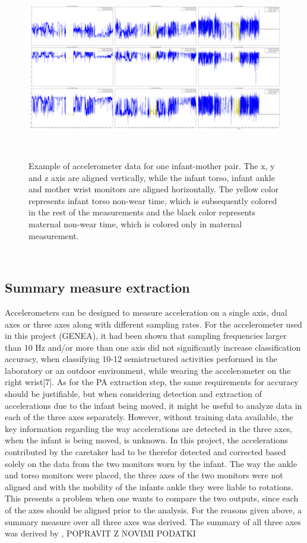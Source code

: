 \documentclass{article}
\begin{document}
{\begin{figure}[h]
\includegraphics[width=15cm, height=8cm]{21NoWearTimeLabeled.png}
\caption{Example of accelerometer data for one infant-mother pair. The x, y and z axis are aligned vertically, while the infant torso, infant ankle and mother wrist monitors are aligned horizontally. The yellow color represents infant torso non-wear time, which is subsequently colored in the rest of the measurements and the black color represents maternal non-wear time, which is colored only in maternal measurement.}
\end{figure}
\\
\subsection{Summary measure extraction}
Accelerometers can be designed to measure acceleration on a single axis, dual axes or three axes along with different sampling rates. For the accelerometer used in this project  (GENEA), it had been shown that sampling frequencies larger than 10 Hz and/or more than one axis did not significantly increase classification accuracy, when classifying 10-12 semistructured activities performed in the laboratory or an outdoor environment, while wearing the accelerometer on the right wrist[7]. As for the PA extraction step, the same requirements for accuracy should be justifiable, but when considering detection and extraction of accelerations due to the infant being moved, it might be useful to analyze data in each of the three axes separately. However, without training data available, the key information regarding the way accelerations are detected in the three axes, when the infant is being moved, is unknown. In this project, the accelerations contributed by the caretaker had to be therefor detected and corrected based solely on the data from the two monitors worn by the infant. The way the ankle and torso monitors were placed, the three axes of the two monitors were not aligned and with the mobility of the infants ankle they were liable to rotations. This presents a problem when one wants to compare the two outputs, since each of the axes should be aligned prior to the analysis. For the reasons given above, a summary measure over all three axes was derived. The summary of all three axes was derived by ,
POPRAVIT Z NOVIMI PODATKI



}
\end{document}
